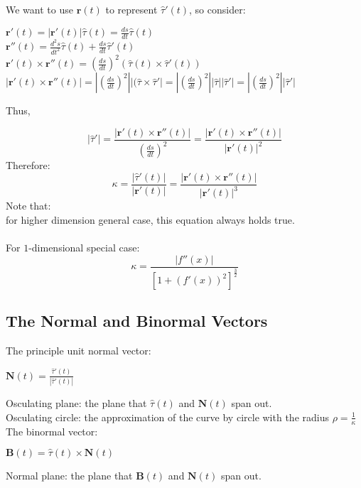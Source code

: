\documentclass[UTF8,a4paper, 10pt, openany]{svmono}
\begin{document}
We want to use $\mathbf{r}(t)$ to represent $\hat{\tau}'(t)$, so consider:

\begin{center}
$\mathbf{r}'(t)=|\mathbf{r}'(t)|\hat{\tau}(t)=\frac{ds}{dt}\hat{\tau}(t)$\\
$\mathbf{r}''(t)=\frac{d^2s}{dt^2}\hat{\tau}(t)+\frac{ds}{dt}\hat{\tau}'(t)$\\
$\mathbf{r}'(t)\times \mathbf{r}''(t)=(\frac{ds}{dt})^2(\hat{\tau}(t)\times \hat{\tau}'(t))$\\
$|\mathbf{r}'(t)\times \mathbf{r}''(t)|=|(\frac{ds}{dt})^2||(\hat{\tau}\times \hat{\tau}'|=|(\frac{ds}{dt})^2||\hat{\tau}||\hat{\tau}'|=|(\frac{ds}{dt})^2||\hat{\tau}'|$
\end{center}

Thus,

\begin{equation}
\boxed{|\hat{\tau}'|=\frac{|\mathbf{r}'(t)\times \mathbf{r}''(t)|}{(\frac{ds}{dt})^2}=\frac{|\mathbf{r}'(t)\times \mathbf{r}''(t)|}{|\mathbf{r}'(t)|^2}}
\end{equation}
Therefore:
\begin{equation}
\boxed{\kappa=\frac{|\hat{\tau}'(t)|}{|\mathbf{r}'(t)|}=\frac{|\mathbf{r}'(t)\times \mathbf{r}''(t)|}{|\mathbf{r}'(t)|^3}}
\end{equation}
Note that:\\
for higher dimension general case, this equation always holds true.\\ \\
For $1$-dimensional special case:
\begin{equation}
\boxed{\kappa=\frac{|f''(x)|}{[1+(f'(x))^2]^{\frac{3}{2}}}}
\end{equation}
\subsection{The Normal and Binormal Vectors}
The principle unit normal vector:
\begin{center}
$\mathbf{N}(t)=\frac{\hat{\tau}'(t)}{|\hat{\tau}'(t)|}$
\end{center}
Osculating plane: the plane that $\hat{\tau}(t)$ and $\mathbf{N}(t)$ span out.\\
Osculating circle: the approximation of the curve by circle with the radius $\rho = \frac{1}{\kappa}$\\
The binormal vector:
\begin{center}
$\mathbf{B}(t)=\hat{\tau}(t)\times \mathbf{N}(t)$
\end{center}
Normal plane: the plane that $\mathbf{B}(t)$ and $\mathbf{N}(t)$ span out.
\end{document}
